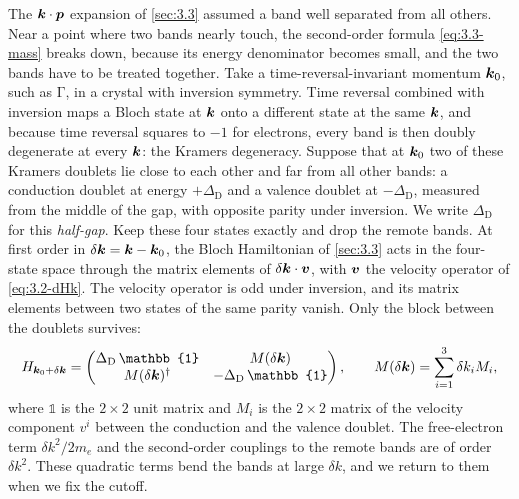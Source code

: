 The $\bm{k}\cdot\bm{p}$ expansion of \cref{sec:3.3} assumed a band well separated from all others. Near a point where two bands nearly touch, the second-order formula \cref{eq:3.3-mass} breaks down, because its energy denominator becomes small, and the two bands have to be treated together. Take a time-reversal-invariant momentum $\bm{k}_0$, such as $\mathrm{\Gamma}$, in a crystal with inversion symmetry. Time reversal combined with inversion maps a Bloch state at $\bm{k}$ onto a different state at the same $\bm{k}$, and because time reversal squares to $-1$ for electrons, every band is then doubly degenerate at every $\bm{k}$: the Kramers degeneracy. Suppose that at $\bm{k}_0$ two of these Kramers doublets lie close to each other and far from all other bands: a conduction doublet at energy $+\Delta_{\mathrm{D}}$ and a valence doublet at $-\Delta_{\mathrm{D}}$, measured from the middle of the gap, with opposite parity under inversion. We write $\Delta_{\mathrm{D}}$ for this \emph{half-gap}. Keep these four states exactly and drop the remote bands. At first order in $\delta\bm{k} = \bm{k} - \bm{k}_0$, the Bloch Hamiltonian of \cref{sec:3.3} acts in the four-state space through the matrix elements of $\delta\bm{k}\cdot\bm{v}$, with $\bm{v}$ the velocity operator of \cref{eq:3.2-dHk}. The velocity operator is odd under inversion, and its matrix elements between two states of the same parity vanish. Only the block between the doublets survives:
\begin{equation}
  H_{\vect{k}_0+\delta\vect{k}} = \begin{pmatrix} \Delta_{\mathrm{D}}\,\mathbb{1} & M(\delta\vect{k}) \\ M(\delta\vect{k})^\dagger & -\Delta_{\mathrm{D}}\,\mathbb{1} \end{pmatrix} , \qquad M(\delta\vect{k}) = \sum_{i=1}^{3}\delta k_iM_i ,
  \label{eq:7.3-block}
\end{equation}
where $\mathbb{1}$ is the $2\times2$ unit matrix and $M_i$ is the $2\times2$ matrix of the velocity component $v^i$ between the conduction and the valence doublet. The free-electron term $\delta k^2/2m_e$ and the second-order couplings to the remote bands are of order $\delta k^2$. These quadratic terms bend the bands at large $\delta k$, and we return to them when we fix the cutoff.

